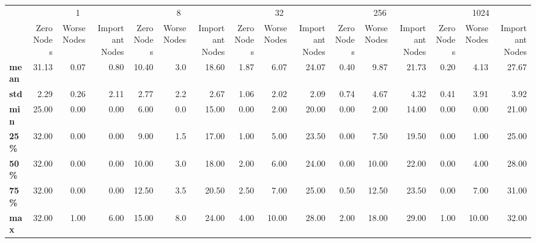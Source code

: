 \begin{tabular}{lrrrrrrrrrrrrrrr}
\toprule
{} & \multicolumn{3}{c}{1} & \multicolumn{3}{c}{8} & \multicolumn{3}{c}{32} & \multicolumn{3}{c}{256} & \multicolumn{3}{c}{1024} \\
{} & Zero Nodes & Worse Nodes & Important Nodes & Zero Nodes & Worse Nodes & Important Nodes & Zero Nodes & Worse Nodes & Important Nodes & Zero Nodes & Worse Nodes & Important Nodes & Zero Nodes & Worse Nodes & Important Nodes \\
\midrule
\textbf{mean} &      31.13 &        0.07 &            0.80 &      10.40 &         3.0 &           18.60 &       1.87 &        6.07 &           24.07 &       0.40 &        9.87 &           21.73 &       0.20 &        4.13 &           27.67 \\
\textbf{std } &       2.29 &        0.26 &            2.11 &       2.77 &         2.2 &            2.67 &       1.06 &        2.02 &            2.09 &       0.74 &        4.67 &            4.32 &       0.41 &        3.91 &            3.92 \\
\textbf{min } &      25.00 &        0.00 &            0.00 &       6.00 &         0.0 &           15.00 &       0.00 &        2.00 &           20.00 &       0.00 &        2.00 &           14.00 &       0.00 &        0.00 &           21.00 \\
\textbf{25\% } &      32.00 &        0.00 &            0.00 &       9.00 &         1.5 &           17.00 &       1.00 &        5.00 &           23.50 &       0.00 &        7.50 &           19.50 &       0.00 &        1.00 &           25.00 \\
\textbf{50\% } &      32.00 &        0.00 &            0.00 &      10.00 &         3.0 &           18.00 &       2.00 &        6.00 &           24.00 &       0.00 &       10.00 &           22.00 &       0.00 &        4.00 &           28.00 \\
\textbf{75\% } &      32.00 &        0.00 &            0.00 &      12.50 &         3.5 &           20.50 &       2.50 &        7.00 &           25.00 &       0.50 &       12.50 &           23.50 &       0.00 &        7.00 &           31.00 \\
\textbf{max } &      32.00 &        1.00 &            6.00 &      15.00 &         8.0 &           24.00 &       4.00 &       10.00 &           28.00 &       2.00 &       18.00 &           29.00 &       1.00 &       10.00 &           32.00 \\
\bottomrule
\end{tabular}

